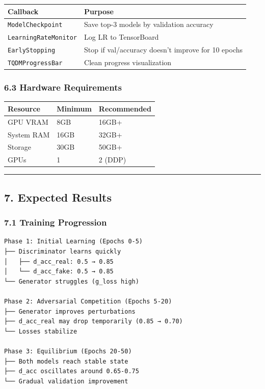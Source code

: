 \begin{longtable}[]{@{}ll@{}}
\toprule\noalign{}
Callback & Purpose \\
\midrule\noalign{}
\endhead
\bottomrule\noalign{}
\endlastfoot
\texttt{ModelCheckpoint} & Save top-3 models by validation accuracy \\
\texttt{LearningRateMonitor} & Log LR to TensorBoard \\
\texttt{EarlyStopping} & Stop if val/accuracy doesn't improve for 10
epochs \\
\texttt{TQDMProgressBar} & Clean progress visualization \\
\end{longtable}

\subsubsection{6.3 Hardware Requirements}\label{hardware-requirements}

\begin{longtable}[]{@{}lll@{}}
\toprule\noalign{}
Resource & Minimum & Recommended \\
\midrule\noalign{}
\endhead
\bottomrule\noalign{}
\endlastfoot
GPU VRAM & 8GB & 16GB+ \\
System RAM & 16GB & 32GB+ \\
Storage & 30GB & 50GB+ \\
GPUs & 1 & 2 (DDP) \\
\end{longtable}

\begin{center}\rule{0.5\linewidth}{0.5pt}\end{center}

\subsection{7. Expected Results}\label{expected-results}

\subsubsection{7.1 Training Progression}\label{training-progression}

\begin{verbatim}
Phase 1: Initial Learning (Epochs 0-5)
├── Discriminator learns quickly
│   ├── d_acc_real: 0.5 → 0.85
│   └── d_acc_fake: 0.5 → 0.85
└── Generator struggles (g_loss high)

Phase 2: Adversarial Competition (Epochs 5-20)
├── Generator improves perturbations
├── d_acc_real may drop temporarily (0.85 → 0.70)
└── Losses stabilize

Phase 3: Equilibrium (Epochs 20-50)
├── Both models reach stable state
├── d_acc oscillates around 0.65-0.75
└── Gradual validation improvement
\end{verbatim}

